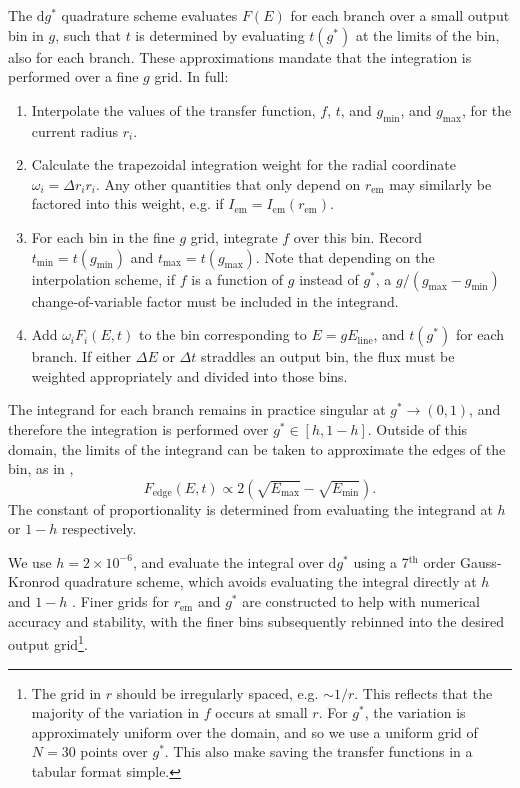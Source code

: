 \documentclass[fleqn,usenatbib]{mnras}
\renewcommand{\d}{\text{d}}
\begin{document}
The $\d g^\ast$ quadrature scheme evaluates $F(E)$ for each branch over a small
output bin in $g$, such that $t$ is determined by evaluating $t(g^\ast)$ at the
limits of the bin, also for each branch. These approximations mandate that the
integration is performed over a fine $g$ grid. In full:
\begin{enumerate}
    \item Interpolate the values of the transfer function, $f$, $t$, and
        $g_\text{min}$, and $g_\text{max}$, for the current radius $r_i$.
    \item Calculate the trapezoidal integration weight for the radial coordinate
        $\omega_i = \Delta r_i r_i$. Any other quantities that only depend on
        $r_\text{em}$ may similarly be factored into this weight, e.g. if
        $I_\text{em} = I_\text{em}(r_\text{em})$.
    \item For each bin in the fine $g$ grid, integrate $f$ over this bin. Record
        $t_\text{min} = t(g_\text{min})$ and $t_\text{max} = t(g_\text{max})$.
        Note that depending on the interpolation scheme, if $f$ is a function of
        $g$ instead of $g^\ast$, a $g / (g_\text{max} - g_\text{min})$
        change-of-variable factor must be included in the integrand.
    \item Add $\omega_i F_i(E, t)$ to the bin corresponding to $E =
        gE_\text{line}$, and $t(g^\ast)$ for each branch. If either $\Delta E$
        or $\Delta t$ straddles an output bin, the flux must be weighted
        appropriately and divided into those bins.
\end{enumerate}

The integrand for each branch remains in practice singular at $g^\ast
\rightarrow (0, 1)$, and therefore the integration is performed over $g^\ast \in
[h, 1 - h]$. Outside of this domain, the limits of the integrand can be taken to
approximate the edges of the bin, as in \cite{dauser_broad_2010},
\begin{equation} F_\text{edge}(E,t) \propto 2\left( \sqrt{E_\text{max}} -
\sqrt{E_\text{min}} \right).  \end{equation} The constant of proportionality is
determined from evaluating the integrand at $h$ or $1 - h$ respectively.

We use $h = 2 \times 10^{-6}$, and evaluate the integral over $\d g^\ast$ using
a 7$^\text{th}$ order Gauss-Kronrod quadrature scheme, which avoids evaluating
the integral directly at $h$ and $1 - h$ \citep{}. Finer grids for $r_\text{em}$
and $g^\ast$ are constructed to help with numerical accuracy and stability, with
the finer bins subsequently rebinned into the desired output grid\footnote{The
grid in $r$ should be irregularly spaced, e.g. $\sim 1 / r$. This reflects
that the majority of the variation in $f$ occurs at small $r$. For $g^\ast$,
the variation is approximately uniform over the domain, and so we use a
uniform grid of $N = 30$ points over $g^\ast$. This also make saving the
transfer functions in a tabular format simple.  }.
\end{document}
